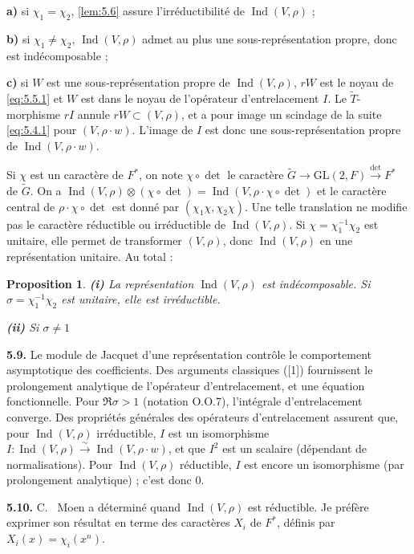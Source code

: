 \documentclass[12pt,a4paper]{article}
\theoremstyle{plain}
\newtheorem{proposition}[theorem]{Proposition}
\theoremstyle{definition}
\theoremstyle{remark}
\DeclareMathOperator{\Ind}{Ind}
\newcommand{\wt}{\widetilde}
\begin{document}
\textbf{a)} si $\chi_1 = \chi_2$, \ref{lem:5.6} assure l'irréductibilité de $\Ind(V, \rho)$ ;

\textbf{b)} si $\chi_1 \neq \chi_2$, $\Ind(V, \rho)$ admet au plus une sous-représentation propre, donc est indécomposable ;

\textbf{c)} si $W$ est une sous-représentation propre de $\Ind(V, \rho)$, $rW$ est le noyau de \eqref{eq:5.5.1} et $W$ est dans le noyau de l'opérateur d'entrelacement $I$. Le $\wt{T}$-morphisme $rI$ annule $rW \subset (V, \rho)$, et a pour image un scindage de la suite \eqref{eq:5.4.1} pour $(V, \rho \cdot w)$. L'image de $I$ est donc une sous-représentation propre de $\Ind(V, \rho \cdot w)$.

Si $\chi$ est un caractère de $F^*$, on note $\chi \circ \det$ le caractère $\wt{G} \to \mathrm{GL}(2, F) \xrightarrow{\det} F^*$ de $\wt{G}$. On a $\Ind(V, \rho) \otimes (\chi \circ \det) = \Ind(V, \rho \cdot \chi \circ \det)$ et le caractère central de $\rho \cdot \chi \circ \det$ est donné par $(\chi_1 \chi, \chi_2 \chi)$. Une telle translation ne modifie pas le caractère réductible ou irréductible de $\Ind(V, \rho)$. Si $\chi = \chi_1^{-1} \chi_2$ est unitaire, elle permet de transformer $(V, \rho)$, donc $\Ind(V, \rho)$ en une représentation unitaire. Au total :

\begin{proposition}\label{prop:5.8}
\textbf{(i)} La représentation $\Ind(V, \rho)$ est indécomposable. Si $\sigma = \chi_1^{-1} \chi_2$ est unitaire, elle est irréductible.

\textbf{(ii)} Si $\sigma \neq 1$
\end{proposition}

\textbf{5.9.} Le module de Jacquet d'une représentation contrôle le comportement asymptotique des coefficients. Des arguments classiques ([1]) fournissent le prolongement analytique de l'opérateur d'entrelacement, et une équation fonctionnelle. Pour $\Re \sigma > 1$ (notation O.O.7), l'intégrale d'entrelacement converge. Des propriétés générales des opérateurs d'entrelacement assurent que, pour $\Ind(V, \rho)$ irréductible, $I$ est un isomorphisme $I : \Ind(V, \rho) \xrightarrow{\sim} \Ind(V, \rho \cdot w)$, et que $I^2$ est un scalaire (dépendant de normalisations). Pour $\Ind(V, \rho)$ réductible, $I$ est encore un isomorphisme (par prolongement analytique) ; c'est donc $0$.

\textbf{5.10.} C.
\ Moen a déterminé quand $\Ind(V, \rho)$ est réductible. Je préfère exprimer son résultat en terme des caractères $X_i$ de $F^*$, définis par $X_i(x) = \chi_i(x^n)$.
\end{document}
